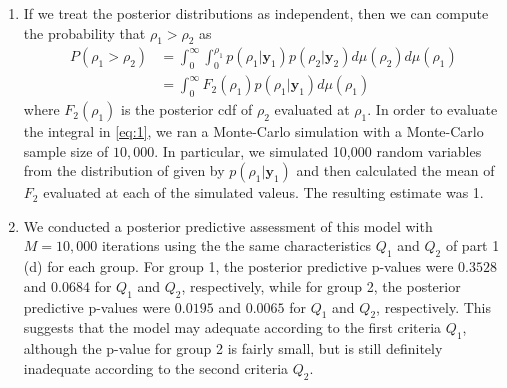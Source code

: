 \documentclass[12pt]{article}
\begin{document}
\begin{enumerate}
\begin{enumerate}
      \item If we treat the posterior distributions as independent, then we can compute the probability that $\rho_1 > \rho_2$ as
        \begin{align}
          P(\rho_1 > \rho_2) & = \int_{0}^{\infty}\int_{0}^{\rho_1}p(\rho_1|\bm{y}_1)p(\rho_2|\bm{y}_2) d\mu(\rho_2)d\mu(\rho_1) \nonumber \\
          & = \int_{0}^{\infty} F_{2}(\rho_1)p(\rho_1|\bm{y}_1) d\mu(\rho_1) \label{eq:1}
        \end{align}
        where $F_{2}(\rho_1)$ is the posterior cdf of $\rho_2$ evaluated at $\rho_1$.
        In order to evaluate the integral in \eqref{eq:1}, we ran a Monte-Carlo simulation with a Monte-Carlo sample size of $10,000$. 
        In particular, we simulated 10,000 random variables from the distribution of given by $p(\rho_1|\bm{y}_1)$ and then calculated the mean 
        of $F_{2}$ evaluated at each of the simulated valeus. The resulting estimate was 1.

      \item We conducted a posterior predictive assessment of this model with $M = 10,000$ iterations 
        using the the same characteristics $Q_1$ and $Q_2$ of part 1 (d) for each group. For group 1, the posterior predictive p-values 
        were $0.3528$ and $0.0684$ for $Q_1$ and $Q_2$, respectively, while for group 2, the posterior predictive p-values were
        $0.0195$ and $0.0065$ for $Q_1$ and $Q_2$, respectively. This suggests that the model may adequate according to the first criteria $Q_1$,
        although the p-value for group 2 is fairly small, but
        is still definitely inadequate according to the second criteria $Q_2$.


\end{enumerate}
\end{enumerate}
\end{document}
